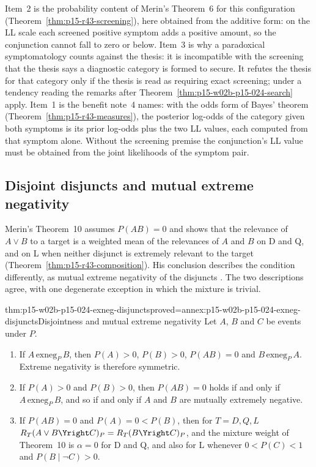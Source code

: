 Item~2 is the probability content of Merin's Theorem~6 for this
configuration (Theorem~\ref{thm:p15-r43-screening}), here obtained from
the additive form: on the LL scale each screened positive symptom adds
a positive amount, so the conjunction cannot fall to zero or below.
Item~3 is why a paradoxical symptomatology counts against the thesis:
it is incompatible with the screening that the thesis says a diagnostic
category is formed to secure. It refutes the thesis for that category
only if the thesis is read as requiring exact screening; under a
tendency reading the remarks after
Theorem~\ref{thm:p15-w02b-p15-024-search} apply. Item~1 is the benefit
note~4 names: with the odds form of Bayes' theorem
(Theorem~\ref{thm:p15-r43-measures}), the posterior log-odds of the
category given both symptoms is its prior log-odds plus the two LL
values, each computed from that symptom alone. Without the screening
premise the conjunction's LL value must be obtained from the joint
likelihoods of the symptom pair.

\subsection{Disjoint disjuncts and mutual extreme negativity}
\label{sec:p15-w02b-p15-024-disjuncts}

Merin's Theorem~10 assumes \(P(AB)=0\) and shows that the relevance of
\(A\vee B\) to a target is a weighted mean of the relevances of \(A\)
and \(B\) on D and Q, and on L when neither disjunct is extremely
relevant to the target (Theorem~\ref{thm:p15-r43-composition}).
His conclusion describes the condition differently, as mutual extreme
negativity of the disjuncts \cite[pp.~273--274]{Merin2021Relevance}.
The two descriptions agree, with one degenerate exception in which the
mixture is trivial.

\begin{hbtheorem}{thm:p15-w02b-p15-024-exneg-disjuncts}{proved=annex:p15-w02b-p15-024-exneg-disjuncts}{Disjointness and mutual extreme negativity}
Let \(A\), \(B\) and \(C\) be events under \(P\).
\begin{enumerate}
\item If \(A\,\mathrm{exneg}_P\,B\), then \(P(A)>0\), \(P(B)>0\),
  \(P(AB)=0\) and \(B\,\mathrm{exneg}_P\,A\). Extreme negativity is
  therefore symmetric.
\item If \(P(A)>0\) and \(P(B)>0\), then \(P(AB)=0\) holds if and only
  if \(A\,\mathrm{exneg}_P\,B\), and so if and only if \(A\) and \(B\)
  are mutually extremely negative.
\item If \(P(AB)=0\) and \(P(A)=0<P(B)\), then for \(T=D,Q,L\)
  \(R_T(A\vee B\Yright C)_P=R_T(B\Yright C)_P\), and the mixture weight
  of Theorem~10 is \(\alpha=0\) for D and Q, and also for L whenever
  \(0<P(C)<1\) and \(P(B\mid\neg C)>0\).
\end{enumerate}
\end{hbtheorem}

